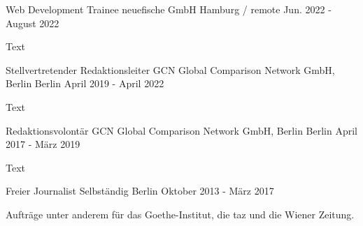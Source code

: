 

\begin{cventries}

  \cventry
    {Web Development Trainee} %
    {neuefische GmbH} %
    {Hamburg / remote} %
    {Jun. 2022 - August 2022} %
    {
      \begin{cvitems} %
        \item {Text}
      \end{cvitems}
    }

  \cventry
    {Stellvertretender Redaktionsleiter} %
    {GCN Global Comparison Network GmbH, Berlin} %
    {Berlin} %
    {April 2019 - April 2022} %
    {
      \begin{cvitems} %
        \item {Text}
      \end{cvitems}
    }

  \cventry
    {Redaktionsvolontär} %
    {GCN Global Comparison Network GmbH, Berlin} %
    {Berlin} %
    {April 2017 - März 2019} %
    {
      \begin{cvitems} %
        \item {Text}
       \end{cvitems}
    }

  \cventry
    {Freier Journalist} %
    {Selbständig} %
    {Berlin} %
    {Oktober 2013 - März 2017} %
    {
      \begin{cvitems} %
        \item {Aufträge unter anderem für das Goethe-Institut, die taz und die Wiener Zeitung.}
       \end{cvitems}
    }


\end{cventries}
